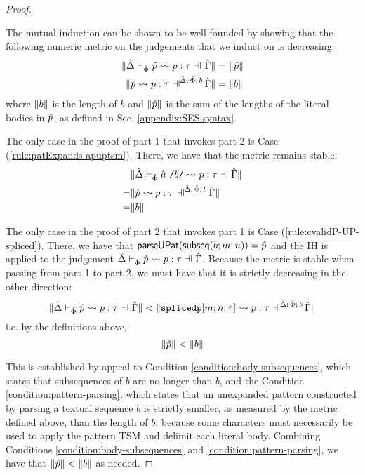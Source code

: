 \begin{grayparbox}
\begin{proof}
\begin{enumerate}
\begin{byCases}
\begin{pfsteps*}
      \end{pfsteps*}
      \resetpfcounter
  \end{byCases}
  \end{enumerate}
The mutual induction can be shown to be well-founded by showing that the following numeric metric on the judgements that we induct on is decreasing:
\begin{align*}
\sizeof{\patExpands{\upctx}{\uPhi}{\upv}{p}{\tau}} & = \sizeof{\upv}\\
\sizeof{{\cvalidP{\upctx}{\pscene{\uDelta}{\uPhi}{b}}{\cpv}{p}{\tau}}} & = \sizeof{b}
\end{align*}
where $\Vert b \Vert$ is the length of $b$ and $\Vert \hat{p} \Vert$ is the sum of the lengths of the literal bodies in $\hat{p}$, as defined in Sec. \ref{appendix:SES-syntax}.

The only case in the proof of part 1 that invokes part 2 is Case (\ref{rule:patExpands-apuptsm}). There, we have that the metric remains stable: \begin{align*}
 & \sizeof{\patExpands{\upctx}{\uPhi}{\utsmap{\tsmv}{b}}{p}{\tau}}\\
=& \sizeof{{\cvalidP{\upctx}{\pscene{\uDelta}{\uPhi}{b}}{\cpv}{p}{\tau}}}\\
=&\sizeof{b}\end{align*}

The only case in the proof of part 2 that invokes part 1 is Case (\ref{rule:cvalidP-UP-spliced}). There, we have that $\mathsf{parseUPat}(\mathsf{subseq}(b; m; n))=\hat{p}$ and the IH is applied to the judgement $\patExpands{\upctx}{\uPhi}{\upv}{p}{\tau}$. Because the metric is stable when passing from part 1 to part 2, we must have that it is strictly decreasing in the other direction:
\[\sizeof{\patExpands{\upctx}{\uPhi}{\upv}{p}{\tau}} < \sizeof{{\cvalidP{\upctx}{\pscene{\uDelta}{\uPhi}{b}}{\acesplicedp{m}{n}{\ctau}}{p}{\tau}}}\]
i.e. by the definitions above, 
\[\Vert \hat{p} \Vert < \Vert b \Vert\]

This is established by appeal to Condition \ref{condition:body-subsequences}, which states that subsequences of $b$ are no longer than $b$, and the Condition \ref{condition:pattern-parsing}, which states that an unexpanded pattern constructed by parsing a textual sequence $b$ is strictly smaller, as measured by the metric defined above, than the length of $b$, because some characters must necessarily be used to apply the pattern TSM and delimit each literal body. Combining Conditions \ref{condition:body-subsequences} and \ref{condition:pattern-parsing}, we have that $\Vert \hat{p} \Vert < \Vert b \Vert$ as needed.
\end{proof}

\end{grayparbox}
